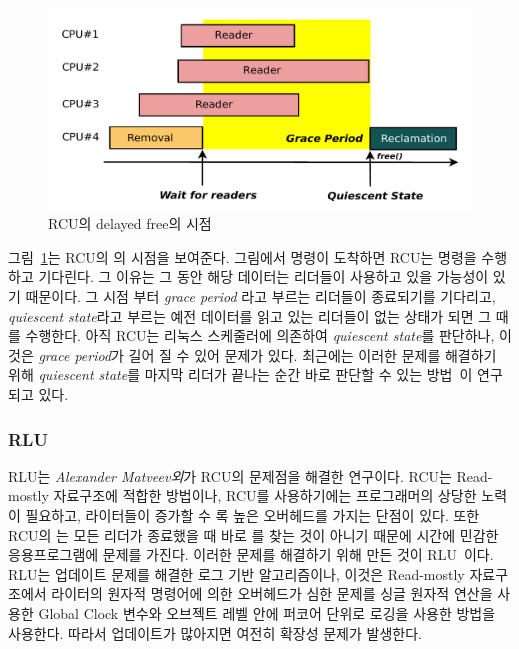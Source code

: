 \begin{figure}[h]
    \centering
    \includegraphics[width=1\textwidth]{fig/rcu/rcu_grace}
    \caption{RCU의 delayed free의 시점}
  \label{fig:rcu_grace}
\end{figure}

그림~\ref{fig:rcu_grace}는 RCU의 의 시점을 보여준다.
그림에서  명령이 도착하면  RCU는  명령을 수행하고 기다린다.  
그 이유는 그 동안 해당 데이터는 리더들이 사용하고 있을 가능성이 있기 때문이다.
그 시점 부터 \textit{grace period} 라고 부르는 리더들이 종료되기를 기다리고, \textit{quiescent
state}라고 부르는 예전 데이터를 읽고 있는 리더들이 없는 상태가 되면 그 때 를 수행한다. 
아직 RCU는 리눅스 스케줄러에 의존하여 \textit{quiescent state}를 판단하나, 
이것은 \textit{grace period}가 길어 질 수 있어 문제가 있다. 
최근에는 이러한 문제를 해결하기 위해 \textit{quiescent state}를 마지막 리더가 끝나는 순간 바로 판단할 
수 있는 방법~\cite{Arbel2015PRR}이 연구되고 있다.

\subsubsection{RLU}

RLU는 \textit{Alexander Matveev외}가 RCU의 문제점을 해결한 연구이다. 
RCU는 Read-mostly 자료구조에 적합한 방법이나, RCU를 사용하기에는 프로그래머의 상당한 노력이 
필요하고, 라이터들이 증가할 수 록 높은 오버헤드를 가지는 단점이 있다.
또한 RCU의 는 모든 리더가 종료했을 때 바로 를 찾는 것이 아니기
때문에 시간에 민감한 응용프로그램에 문제를 가진다. 
이러한 문제를 해결하기 위해 만든 것이 RLU~\cite{Matveev2015RLU}이다. 
RLU는 업데이트 문제를 해결한 로그 기반 알고리즘이나, 
이것은 Read-mostly 자료구조에서 라이터의 원자적 명령어에 의한 오버헤드가 심한 문제를 
싱글 원자적 연산을 사용한 Global Clock 변수와 오브젝트 레벨 안에 퍼코어 단위로 로깅을 사용한 방법을 사용한다.
따라서 업데이트가 많아지면 여전히 확장성 문제가 발생한다. 

